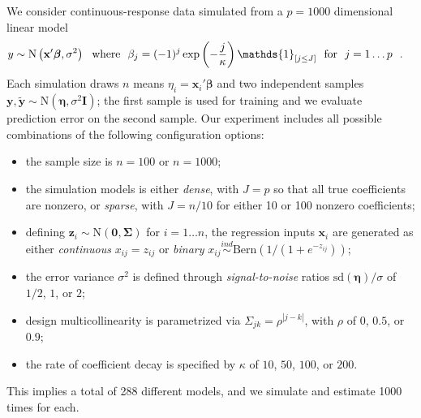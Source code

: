 \documentclass[12pt]{article}
\newcommand{\bs}[1]{\boldsymbol{#1}}
\newcommand{\mr}[1]{\mathrm{#1}}
\newcommand{\bm}[1]{\mathbf{#1}}
\newcommand{\ds}[1]{\mathds{#1}}
\begin{document}
We consider continuous-response data simulated from
 a $p=1000$ dimensional linear model
\begin{align}\vspace{-.1cm}
\label{simdgp}
y &\sim \mr{N}\left(\bm{x}'\bs{\beta},\sigma^2\right) ~~\text{where}~~
\beta_j = (-1)^j\exp\left(-\frac{j}{{\kappa}} \right)\ds{1}_{[j\leq J]}~~\text{for}~~j=1\dots p~~.
\end{align}\vspace{-.1cm}
Each simulation draws $n$ means $\eta_i =
\bm{x}_i'\bs{\beta}$ and two independent samples 
$\bm{y},\bm{\tilde y} \sim \mr{N}(\bs{\eta},\sigma^2\bm{I})$;  the first
sample is used for training and we evaluate prediction error on the second
sample.  Our experiment includes all possible combinations of the following configuration options:
\begin{itemize}\vspace{-.1cm}\setlength\itemsep{0em}
\item the sample size is $n=100$ or $n=1000$;
\item the simulation models is either {\it dense}, with $J=p$ so that all true coefficients are nonzero, or 
  {\it sparse}, with $J = n/10$ for either 10 or 100 nonzero coefficients;
\item defining $\bm{z}_i \sim \mr{N}\left(\bm{0},\bs{\Sigma}\right)$ for $i=1\ldots n$, the regression inputs $\bm{x}_i$ are generated as either \textit{continuous} $x_{ij}=z_{ij}$  or \textit{binary}  $x_{ij} \stackrel{ind}{\sim} \mr{Bern}\left( 1/(1+e^{-z_{ij}})\right)$;
\item the error variance $\sigma^2$ is defined through {\it signal-to-noise}
ratios $\mr{sd}(\bs{\eta})/\sigma$ of $1/2$, $1$, or $2$;
\item design multicollinearity is parametrized via $\Sigma_{jk} =
\rho^{|j-k|}$, with $\rho$ of $0$, $0.5$, or $0.9$;
\item the rate of coefficient decay is specified by
${\kappa}$ of $10$, $50$, $100$, or $200$.  
\end{itemize}\vspace{-.1cm}
This implies a total of 288 different models, and we simulate and estimate 1000 times for each.
\end{document}
